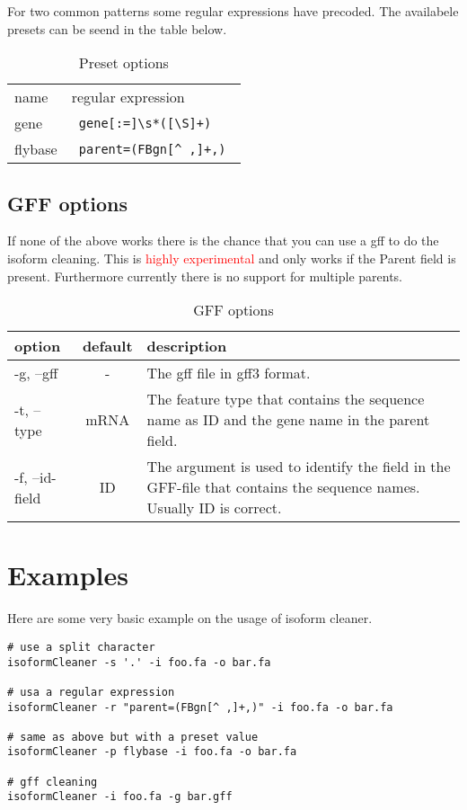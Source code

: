 For two common patterns some regular expressions have precoded. The availabele presets can be seend in the table below.
\begin{center}
 \begin{table}[H]
\caption{Preset options}
\begin{tabular}{ll}\hline
name &regular expression\\
gene & \verb| gene[:=]\s*([\S]+) |\\
flybase& \verb| parent=(FBgn[^ ,]+,) |\\\hline
\end{tabular}
\end{table}
\end{center}

\subsection{GFF options}

If none of the above works there is the chance that you can use a gff to do the isoform cleaning.
This is \textcolor{red}{highly experimental} and only works if the Parent field is present. Furthermore currently there is no support for multiple parents.

\begin{table}[H]
\caption{GFF options}
\begin{tabular}{lcp{10cm}}\hline
option & default & description\\
\hline
-g, --gff 	&-& 	The gff file in gff3 format.\\
-t, --type 	&mRNA& 	The feature type that contains the sequence name as ID and the gene name in the parent field.\\
-f, --id-field 	&ID& 	The argument is used to identify the field in the GFF-file that contains the sequence names. Usually ID is correct.\\
\end{tabular}
\end{table}


\section{Examples}

Here are some very basic example on the usage of isoform cleaner.

\begin{lstlisting}
# use a split character
isoformCleaner -s '.' -i foo.fa -o bar.fa

# usa a regular expression
isoformCleaner -r "parent=(FBgn[^ ,]+,)" -i foo.fa -o bar.fa

# same as above but with a preset value
isoformCleaner -p flybase -i foo.fa -o bar.fa

# gff cleaning
isoformCleaner -i foo.fa -g bar.gff
\end{lstlisting}
